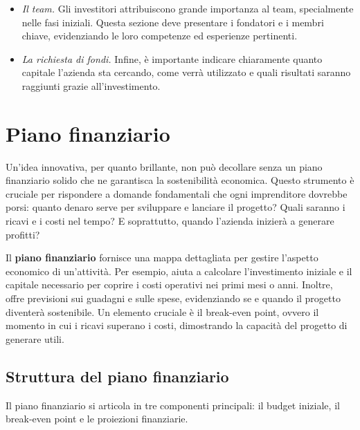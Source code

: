 \begin{itemize}
    \item \textit{Il team.} Gli investitori attribuiscono grande importanza al team, specialmente nelle fasi iniziali. Questa sezione deve presentare i fondatori e i membri chiave, evidenziando le loro competenze ed esperienze pertinenti.
    \item \textit{La richiesta di fondi.} Infine, è importante indicare chiaramente quanto capitale l’azienda sta cercando, come verrà utilizzato e quali risultati saranno raggiunti grazie all’investimento.
\end{itemize}


\chapter{Piano finanziario}
Un'idea innovativa, per quanto brillante, non può decollare senza un piano finanziario solido che ne garantisca la sostenibilità economica. Questo strumento è cruciale per rispondere a domande fondamentali che ogni imprenditore dovrebbe porsi: quanto denaro serve per sviluppare e lanciare il progetto? Quali saranno i ricavi e i costi nel tempo? E soprattutto, quando l’azienda inizierà a generare profitti?

\begin{redbar}
Il \textbf{piano finanziario} fornisce una mappa dettagliata per gestire l’aspetto economico di un’attività. Per esempio, aiuta a calcolare l’investimento iniziale e il capitale necessario per coprire i costi operativi nei primi mesi o anni. Inoltre, offre previsioni sui guadagni e sulle spese, evidenziando se e quando il progetto diventerà sostenibile. Un elemento cruciale è il break-even point, ovvero il momento in cui i ricavi superano i costi, dimostrando la capacità del progetto di generare utili.
\end{redbar}

\section{Struttura del piano finanziario}
Il piano finanziario si articola in tre componenti principali: il budget iniziale, il break-even point e le proiezioni finanziarie.

